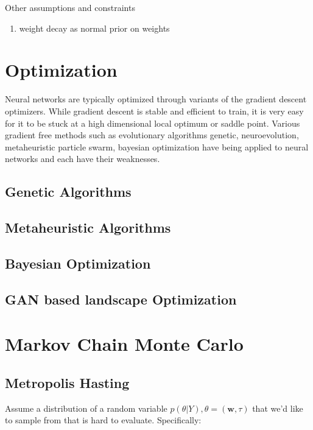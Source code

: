 \documentclass[honours,12pt]{unswthesis}
\numberwithin{equation}{section}
\begin{document}
Other assumptions and constraints
\begin{enumerate}
\item weight decay as normal prior on weights
\end{enumerate}

\section{Optimization}
Neural networks are typically optimized through variants of the gradient descent optimizers. While gradient descent is stable and efficient to train, it is very easy for it to be stuck at a high dimensional local optimum or saddle point. Various gradient free methods such as evolutionary algorithms {genetic, neuroevolution}, metaheuristic {particle swarm}, bayesian optimization {} have being applied to neural networks and each have their weaknesses. 
\subsection{Genetic Algorithms}
\subsection{Metaheuristic Algorithms}
\subsection{Bayesian Optimization}
\subsection{GAN based landscape Optimization}

\section{Markov Chain Monte Carlo}
\subsection {Metropolis Hasting}
Assume a distribution of a random variable $p(\theta|Y), \theta = (\bm{w},\tau)$ that we'd like to sample from that is hard to evaluate. Specifically:
\end{document}

